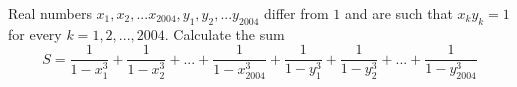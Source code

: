Real numbers $x_1,x_2,...x_{2004},y_1,y_2,...y_{2004}$ differ from $1$ and are such that $x_ky_k=1$ for every $k=1,2,...,2004$. Calculate the sum
$$S=\frac{1}{1-x_1^3}+\frac{1}{1-x_2^3}+...+\frac{1}{1-x_{2004}^3}+\frac{1}{1-y_1^3}+\frac{1}{1-y_2^3}+...+\frac{1}{1-y_{2004}^3}$$